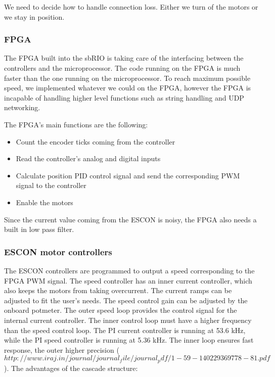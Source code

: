 We need to decide how to handle connection loss. Either we turn of the motors or we stay in position.

\subsubsection{FPGA}

The FPGA built into the sbRIO is taking care of the interfacing between the controllers and the microprocessor. The code running on the FPGA is much faster than the one running on the microprocessor. To reach maximum possible speed, we implemented whatever we could on the FPGA, however the FPGA is incapable of handling higher level functions such as string handling and UDP networking.

The FPGA's main functions are the following:

\begin{itemize}	
	\setlength\itemsep{0em}
	\item Count the encoder ticks coming from the controller
	\item Read the controller's analog and digital inputs 
	\item Calculate position PID control signal and send the corresponding PWM signal to the controller
	\item Enable the motors
	
\end{itemize}

Since the current value coming from the ESCON is noisy, the FPGA also needs a built in low pass filter.

\subsubsection{ESCON motor controllers}

The ESCON controllers are programmed to output a speed corresponding to the FPGA PWM signal. The speed controller has an inner current controller, which also keeps the motors from taking overcurrent. The current ramps can be adjusted to fit the user's needs. The speed control gain can be adjusted by the onboard potmeter. 
The outer speed loop provides the control signal for the internal current controller. The inner control loop must have a higher frequency than the speed control loop. The PI current controller is running at 53.6 kHz, while the PI speed controller is running at 5.36 kHz. The inner loop ensures fast response, the outer higher precision ($http://www.iraj.in/journal/journal_file/journal_pdf/1-59-140229369778-81.pdf$). The advantages of the cascade structure:

